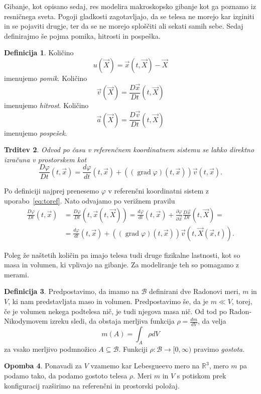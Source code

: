 \documentclass[12pt,a4paper]{article}
\theoremstyle{definition} %
\newtheorem{definicija}{Definicija}[section]
\newtheorem{opomba}[definicija]{Opomba}
\theoremstyle{plain} %
\newtheorem{trditev}[definicija]{Trditev}
\numberwithin{equation}{section}
\newcommand{\R}{\mathbb R}
\newcommand{\B}{\mathcal{B}}
\newcommand{\grad}{\operatorname{grad}}
\renewcommand{\phi}{\varphi}
\newcommand{\dpar}[2]{\ensuremath{\frac{\partial #1}{\partial #2}}}
\newcommand{\dd}[2]{\ensuremath{\frac{d #1}{d #2}}}
\newcommand{\ddt}[1]{\dd{#1}{t}}
\newcommand{\DD}[2]{\ensuremath{\frac{D #1}{D #2}}}
\newcommand{\DDt}[1]{\DD{#1}{t}}
\newcommand{\vv}{\vec{v}}
\newcommand{\va}{\vec{a}}
\newcommand{\vX}{\vec{X}}
\newcommand{\vx}{\vec{x}}
\begin{document}
Gibanje, kot opisano sedaj, res modelira makroskopsko gibanje kot ga poznamo iz
resničnega sveta. Pogoji gladkosti zagotavljajo, da se telesa ne morejo kar
izginiti in se pojaviti drugje, ter da se ne morejo sploščiti ali sekati samih
sebe. Sedaj definirajmo še pojma pomika, hitrosti in pospeška.

\begin{definicija}
  Količino \[ u(\vX) = \vx(t, \vX) - \vX \] imenujemo \emph{pomik}.
  Količino \[ \vv(\vX) = \DDt{\vx}(t, \vX) \] imenujemo \emph{hitrost}.
  Količino \[ \va(\vX) = \DDt{\vv}(t, \vX) \] imenujemo \emph{pospešek}.
\end{definicija}
\begin{trditev}
  Odvod po času v referenčnem koordinatnem sistemu se lahko direktno izračuna v
  prostorskem kot
  \[
  \DDt{\phi}(t, \vx) = \ddt{\phi}(t, \vx) + ((\grad \phi)(t, \vx)) \vv(t, \vx).
  \]
\end{trditev}
\proof
  Po definiciji najprej prenesemo $\phi$ v referenčni koordinatni sistem z
  uporabo~\ref{eq:toref}. Nato odvajamo po verižnem pravilu
  \begin{align*}
    \DDt \phi(t, \vx) &= \DDt \phi(t, \vx(t, \vX)) =
    \ddt \phi(t, \vx) + \dpar{\phi}{\vx} \DDt{\vx} (t, \vX) = \\
    &= \ddt \phi(t, \vx) + ((\grad \phi)(t, \vx)) \vv(t, \vX(\vx, t)).
  \end{align*}
\endproof

Poleg že naštetih količin pa imajo telesa tudi druge fizikalne lastnosti, kot so
masa in volumen, ki vplivajo na gibanje. Za modeliranje teh so pomagamo z
merami.

\begin{definicija}
  Predpostavimo, da imamo na $\B$ definirani dve Radonovi meri, $m$ in
  $V$, ki nam predstavljata maso in volumen. Predpostavimo še, da je $m \ll V$,
  torej, če je volumen nekega podtelesa nič, je tudi njegova masa nič. Od tod po
  Radon-Nikodymovem izreku sledi, da obstaja merljiva funkcija $\rho =
  \dd{m}{V}$, da velja
  \[
    m(A) = \int_{A} \rho dV
  \]
  za vsako merljivo podmnožico $A \subseteq \B$.
  Funkciji $\rho\colon\B\to[0, \infty)$ pravimo \emph{gostota}.
\end{definicija}
\begin{opomba}
  Ponavadi za $V$ vzamemo kar Lebesgueevo mero na $\R^3$, mero $m$ pa podamo tako, da
  podamo gostoto telesa $\rho$. Meri $m$ in $V$ s potiskom prek konfiguracij
  razširimo na referenčni in prostorski položaj.
\end{opomba}
\end{document}

